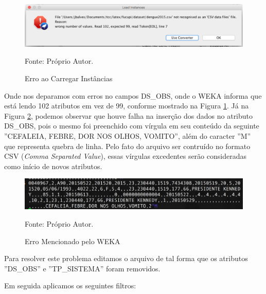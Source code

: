\documentclass[
	12pt,				%
	openright,			%
	oneside,	
	a4paper,				%
	english,				%
	brazil				%
]{abntex2/abntex2} %
\begin{document}
		\begin{figure}[!htb]
			\caption{\label{figerroCarregarInstancias} \fontsize{10}{\baselineskip} \selectfont Erro ao Carregar Instâncias}
			\begin{center}
				\includegraphics[scale=0.55]{img/erroCarregarInstancias.png}
			\end{center}
			{\fontsize{10}{\baselineskip} \selectfont Fonte: Próprio Autor.}
		\end{figure}

	Onde nos deparamos com erros no campos DS\_OBS, onde o WEKA informa que está lendo 102 atributos em vez de 99, conforme mostrado na Figura \ref{figerroCarregarInstancias}. Já na Figura \ref{figerroLinhaSete}, podemos observar que houve falha na inserção dos dados no atributo DS\_OBS, pois o mesmo foi preenchido com vírgula em seu conteúdo da seguinte ''CEFALEIA, FEBRE, DOR NOS OLHOS, VOMITO'', além do caracter ''M'' que representa quebra de linha. Pelo fato do arquivo ser contruído no formato CSV (\textit{Comma Separated Value}), essas vírgulas excedentes serão consideradas como início de novos atributos.
	

	
		\begin{figure}[!htb]
			\caption{\label{figerroLinhaSete} \fontsize{10}{\baselineskip} \selectfont Erro Mencionado pelo WEKA}
			\begin{center}
				\includegraphics[scale=0.45]{img/erroLinhaSete.png}
			\end{center}
			{\fontsize{10}{\baselineskip} \selectfont Fonte: Próprio Autor.}
		\end{figure}
		
		Para resolver este problema editamos o arquivo de tal forma que os atributos ''DS\_OBS'' e ''TP\_SISTEMA'' foram removidos. 
		
		Em seguida aplicamos os seguintes filtros:
		
\end{document}
